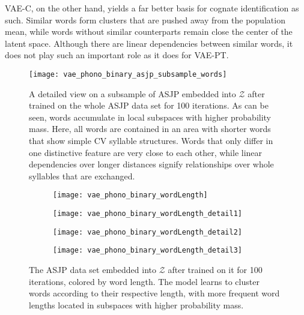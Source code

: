 \documentclass[6pt]{article}
\begin{document}
VAE-C, on the other hand, yields a far better basis for cognate identification as such. Similar words form clusters that are pushed away from the population mean, while words without similar counterparts remain close the center of the latent space. Although there are linear dependencies between similar words, it does not play such an important role as it does for VAE-PT.  
\begin{figure}[h!] %
   \centering
   \texttt{[image: vae\_phono\_binary\_asjp\_subsample\_words]} 
   \caption{A detailed view on a subsample of ASJP embedded into $\mathcal{Z}$ after trained on the whole ASJP data set for 100 iterations. As can be seen, words accumulate in local subspaces with higher probability mass. Here, all words are contained in an area with shorter words that show simple CV syllable structures. Words that only differ in one distinctive feature are very close to each other, while linear dependencies over longer distances signify relationships over whole syllables that are exchanged.}
   \label{fig:vae_phono_binary_asjp_subsample_words}
\end{figure}

    
    \begin{figure}[ht] 
  \begin{subfigure}[b]{0.5\linewidth}
    \centering
    \texttt{[image: vae\_phono\_binary\_wordLength]} 
    \label{fig:vae_phono_binary_wordLength0} 
    \vspace{4ex}
  \end{subfigure}%
  \begin{subfigure}[b]{0.5\linewidth}
    \centering
    \texttt{[image: vae\_phono\_binary\_wordLength\_detail1]} 
    \label{fig:vae_phono_binary_wordLength1} 
    \vspace{4ex}
  \end{subfigure} 
  \begin{subfigure}[b]{0.5\linewidth}
    \centering
    \texttt{[image: vae\_phono\_binary\_wordLength\_detail2]} 
    \label{fig:vae_phono_binary_wordLength2} 
  \end{subfigure}%
  \begin{subfigure}[b]{0.5\linewidth}
    \centering
    \texttt{[image: vae\_phono\_binary\_wordLength\_detail3]} 
    \label{fig:vae_phono_binary_wordLength3} 
  \end{subfigure} 
  \caption{The ASJP data set embedded into $\mathcal{Z}$ after trained on it for 100 iterations, colored by word length. The model learns to cluster words according to their respective length, with more frequent word lengths located in subspaces with higher probability mass.}
  \label{fig:vae_phono_binary_wordLength} 
\end{figure}
\end{document}
